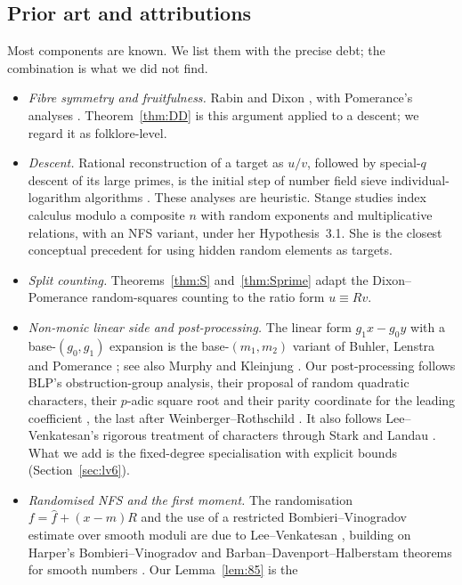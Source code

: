 \documentclass[11pt]{amsart}
\theoremstyle{definition}
\begin{document}
\subsection{Prior art and attributions}\label{sec:prior}
Most components are known. We list them with the precise debt; the combination is what we did not find.
\begin{itemize}
\item \emph{Fibre symmetry and fruitfulness.} Rabin \cite{rabin1979} and Dixon \cite{dixon1981}, with
  Pomerance's analyses \cite{pomerance1982,pomerance1987}. Theorem~\ref{thm:DD} is this argument applied to a
  descent; we regard it as folklore-level.
\item \emph{Descent.} Rational reconstruction of a target as $u/v$, followed by special-$q$ descent of
  its large primes, is the initial step of number field sieve individual-logarithm algorithms
  \cite{gordon1993,jouxlercier2003,commeinesemaev2006}. These analyses are heuristic. Stange \cite{stange2022} studies
  index calculus modulo a composite $n$ with random exponents and multiplicative relations, with an NFS
  variant, under her Hypothesis~3.1. She is the closest conceptual precedent for using hidden random
  elements as targets.
\item \emph{Split counting.} Theorems~\ref{thm:S} and~\ref{thm:Sprime} adapt the Dixon--Pomerance
  random-squares counting \cite{dixon1981,pomerance1982} to the ratio form $u\equiv Rv$.
\item \emph{Non-monic linear side and post-processing.} The linear form $g_1x-g_0y$ with a base-$(g_0,g_1)$
  expansion is the base-$(m_1,m_2)$ variant of Buhler, Lenstra and Pomerance \cite[\S\S3,12]{blp1993}; see also
  Murphy \cite[\S2.3.2]{murphy1999} and Kleinjung \cite{kleinjung2006}. Our post-processing follows BLP's
  obstruction-group analysis, their proposal of random quadratic characters, their $p$-adic square root and their parity coordinate for
  the leading coefficient \cite[\S\S6,8,9,12]{blp1993}, the last after Weinberger--Rothschild \cite{weinbergerrothschild1976}. It also follows
  Lee--Venkatesan's rigorous treatment of characters through Stark and Landau \cite[\S6]{lv2018}. What we add
  is the fixed-degree specialisation with explicit bounds (Section~\ref{sec:lv6}).
\item \emph{Randomised NFS and the first moment.} The randomisation $f=\hat f+(x-m)R$ and the use of a restricted
  Bombieri--Vinogradov estimate over smooth moduli are due to Lee--Venkatesan \cite[\S\S5,8]{lv2018}, building on Harper's
  Bombieri--Vinogradov and Barban--Davenport--Halberstam theorems for smooth numbers \cite{harper2012}. Our Lemma~\ref{lem:85} is the

\end{itemize}
\end{document}
